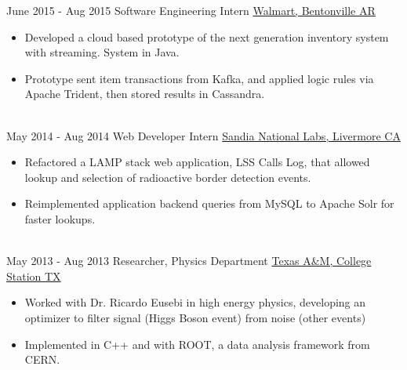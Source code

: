 \documentclass[letterpaper]{twentysecondcv} %
\begin{document}
\begin{twenty}
\twentyitem
    {June 2015}
    {- Aug 2015}
    {Software Engineering Intern}
    {\href{https://careers.walmart.com/technology/information-technology}{Walmart, Bentonville AR}}
    {}
    {
        \begin{itemize}
            \item Developed a cloud based prototype of the next generation inventory system with streaming.  System in Java.
            \item Prototype sent item transactions from Kafka, and applied logic rules via Apache Trident, then stored results in Cassandra.
        \end{itemize}
    }
	\\
\twentyitem
    {May 2014}
    {- Aug 2014}
    {Web Developer Intern}
    {\href{https://www.sandia.gov/locations/livermore_california.html}{Sandia National Labs, Livermore CA}}
    {}
    {
        \begin{itemize}
            \item Refactored a LAMP stack web application, LSS Calls Log, that allowed lookup and selection of radioactive border detection events.
            \item Reimplemented application backend queries from MySQL to Apache Solr for faster lookups.
        \end{itemize}
    }
    \\
    
    
    
\twentyitem
    {May 2013}
    {- Aug 2013}
    {Researcher, Physics Department}
    {\href{http://people.physics.tamu.edu/eusebi/main/index.html}{Texas A\&M, College Station TX}}
    {}
    {
        \begin{itemize}
            \item Worked with Dr. Ricardo Eusebi in high energy physics, developing an optimizer to filter signal (Higgs Boson event) from noise (other events)
            \item Implemented in C++ and with ROOT, a data analysis framework from CERN.
        \end{itemize}
    }
\end{twenty}
\end{document}
